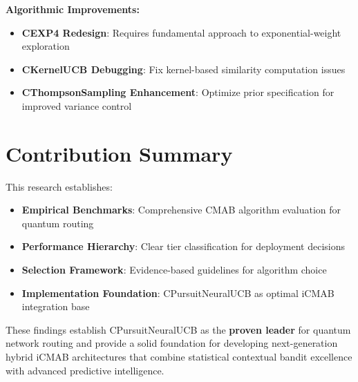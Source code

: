 \documentclass[12pt,a4paper]{article}
\newcommand{\primarytext}[1]{\textcolor{primaryblue}{\textbf{#1}}}
\newcommand{\secondarytext}[1]{\textcolor{secondaryblue}{\textbf{#1}}}
\newcommand{\success}[1]{\textcolor{accentgreen}{\textbf{#1}}}
\newcommand{\warning}[1]{\textcolor{warningred}{\textbf{#1}}}
\begin{document}
\textbf{Algorithmic Improvements:}
\begin{itemize}
\item \warning{CEXP4 Redesign}: Requires fundamental approach to exponential-weight exploration
\item \warning{CKernelUCB Debugging}: Fix kernel-based similarity computation issues
\item \secondarytext{CThompsonSampling Enhancement}: Optimize prior specification for improved variance control
\end{itemize}

\section{Contribution Summary}

This research establishes:

\begin{itemize}
\item \primarytext{Empirical Benchmarks}: Comprehensive CMAB algorithm evaluation for quantum routing
\item \success{Performance Hierarchy}: Clear tier classification for deployment decisions
\item \secondarytext{Selection Framework}: Evidence-based guidelines for algorithm choice
\item \textbf{Implementation Foundation}: CPursuitNeuralUCB as optimal iCMAB integration base
\end{itemize}

These findings establish CPursuitNeuralUCB as the \primarytext{proven leader} for quantum network routing and provide a solid foundation for developing next-generation hybrid iCMAB architectures that combine statistical contextual bandit excellence with advanced predictive intelligence.
\end{document}
